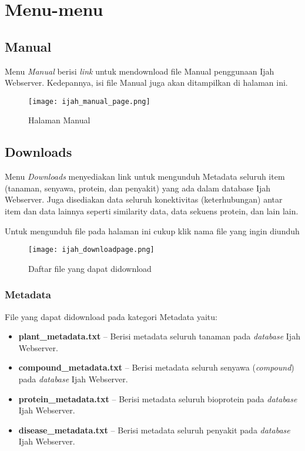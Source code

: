 \chapter{Menu-menu}  \label{Menu}

\section{Manual}
Menu \emph{Manual} berisi \emph{link} untuk mendownload file Manual penggunaan Ijah Webserver. Kedepannya, isi file Manual juga akan ditampilkan di halaman ini.

\begin{figure}[H]
	\centering
	\texttt{[image: ijah\_manual\_page.png]}
	\caption{Halaman Manual}
	\label{fig:ijah_manual_page}
\end{figure}

\section{Downloads} \label{Downloads}
Menu \emph{Downloads} menyediakan link untuk mengunduh Metadata seluruh item (tanaman, senyawa, protein, dan penyakit) yang ada dalam database Ijah Webserver. Juga disediakan data seluruh konektivitas (keterhubungan) antar item dan data lainnya seperti similarity data, data sekuens protein, dan lain lain.

Untuk mengunduh file pada halaman ini cukup klik nama file yang ingin diunduh

\begin{figure}[H]
	\centering
	\texttt{[image: ijah\_downloadpage.png]}
	\caption{Daftar file yang dapat di\-download}
	\label{fig:ijah_downloadpage}
\end{figure}

	\subsection{Metadata}
	File yang dapat didownload pada kategori Metadata yaitu:

	\begin{itemize}
	\item \textbf{plant\_metadata.txt} -- Berisi metadata seluruh tanaman pada \emph{database} Ijah Webserver. 
	\item \textbf{compound\_metadata.txt} -- Berisi metadata seluruh senyawa (\emph{compound}) pada \emph{database} Ijah Webserver.
	\item \textbf{protein\_metadata.txt} -- Berisi metadata seluruh bioprotein pada \emph{database} Ijah Webserver.
	\item \textbf{disease\_metadata.txt} -- Berisi metadata seluruh penyakit pada \emph{database} Ijah Webserver.
	\end{itemize}

